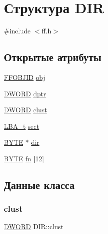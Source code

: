 \hypertarget{struct_d_i_r}{}\section{Структура D\+IR}
\label{struct_d_i_r}


{\ttfamily \#include $<$ff.\+h$>$}

\subsection*{Открытые атрибуты}
\begin{DoxyCompactItemize}
\item 
\mbox{\hyperlink{struct_f_f_o_b_j_i_d}{F\+F\+O\+B\+J\+ID}} \mbox{\hyperlink{struct_d_i_r_a8fa2dfd8198410ea92a98281d982cf44}{obj}}
\item 
\mbox{\hyperlink{ff_8h_ad342ac907eb044443153a22f964bf0af}{D\+W\+O\+RD}} \mbox{\hyperlink{struct_d_i_r_a0330e9554e1f38795debe4495156873e}{dptr}}
\item 
\mbox{\hyperlink{ff_8h_ad342ac907eb044443153a22f964bf0af}{D\+W\+O\+RD}} \mbox{\hyperlink{struct_d_i_r_acfbb8ba2d6e73b6f999ceffd1857c190}{clust}}
\item 
\mbox{\hyperlink{ff_8h_a1f3c30a83148a28340f009d4e583f087}{L\+B\+A\+\_\+t}} \mbox{\hyperlink{struct_d_i_r_ae76119034beae8f34eb1536d0ef83a40}{sect}}
\item 
\mbox{\hyperlink{ff_8h_a4ae1dab0fb4b072a66584546209e7d58}{B\+Y\+TE}} $\ast$ \mbox{\hyperlink{struct_d_i_r_a6c2a8c0cf2d55ae99775e93a16593449}{dir}}
\item 
\mbox{\hyperlink{ff_8h_a4ae1dab0fb4b072a66584546209e7d58}{B\+Y\+TE}} \mbox{\hyperlink{struct_d_i_r_ad90d974c0e7640307598c586bf141b32}{fn}} \mbox{[}12\mbox{]}
\end{DoxyCompactItemize}


\subsection{Данные класса}
\mbox{\label{struct_d_i_r_acfbb8ba2d6e73b6f999ceffd1857c190}} 
\subsubsection{\texorpdfstring{clust}{clust}}
{\footnotesize\ttfamily \mbox{\hyperlink{ff_8h_ad342ac907eb044443153a22f964bf0af}{D\+W\+O\+RD}} D\+I\+R\+::clust}

